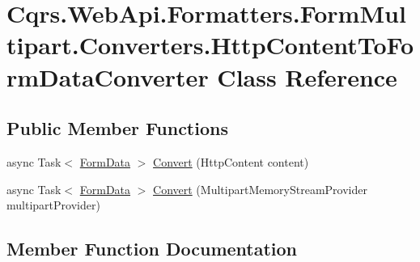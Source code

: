 \hypertarget{classCqrs_1_1WebApi_1_1Formatters_1_1FormMultipart_1_1Converters_1_1HttpContentToFormDataConverter}{}\section{Cqrs.\+Web\+Api.\+Formatters.\+Form\+Multipart.\+Converters.\+Http\+Content\+To\+Form\+Data\+Converter Class Reference}
\label{classCqrs_1_1WebApi_1_1Formatters_1_1FormMultipart_1_1Converters_1_1HttpContentToFormDataConverter}
\subsection*{Public Member Functions}
\begin{DoxyCompactItemize}
\item 
async Task$<$ \hyperlink{classCqrs_1_1WebApi_1_1Formatters_1_1FormMultipart_1_1Infrastructure_1_1FormData}{Form\+Data} $>$ \hyperlink{classCqrs_1_1WebApi_1_1Formatters_1_1FormMultipart_1_1Converters_1_1HttpContentToFormDataConverter_aea4d3dbab4e6f6892a6181a0911d4652}{Convert} (Http\+Content content)
\item 
async Task$<$ \hyperlink{classCqrs_1_1WebApi_1_1Formatters_1_1FormMultipart_1_1Infrastructure_1_1FormData}{Form\+Data} $>$ \hyperlink{classCqrs_1_1WebApi_1_1Formatters_1_1FormMultipart_1_1Converters_1_1HttpContentToFormDataConverter_ae6f522873d47a96df7b4616c7e2d6290}{Convert} (Multipart\+Memory\+Stream\+Provider multipart\+Provider)
\end{DoxyCompactItemize}


\subsection{Member Function Documentation}
\mbox{\label{classCqrs_1_1WebApi_1_1Formatters_1_1FormMultipart_1_1Converters_1_1HttpContentToFormDataConverter_aea4d3dbab4e6f6892a6181a0911d4652}} 
